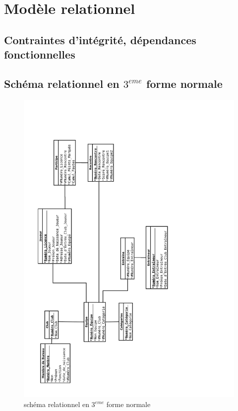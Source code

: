 \documentclass{article}
\begin{document}
\newpage
\section{Modèle relationnel}





\subsection{Contraintes d'intégrité, dépendances fonctionnelles}

\newpage
\subsection{Schéma relationnel en $3^{eme}$ forme normale}

\begin{figure}[h!]
\centering
\includegraphics[scale = 0.35, angle = -90]{BasketBall_Relationnel.pdf}
\caption{schéma relationnel en $3^{eme}$ forme normale}
\end{figure}
\end{document}
